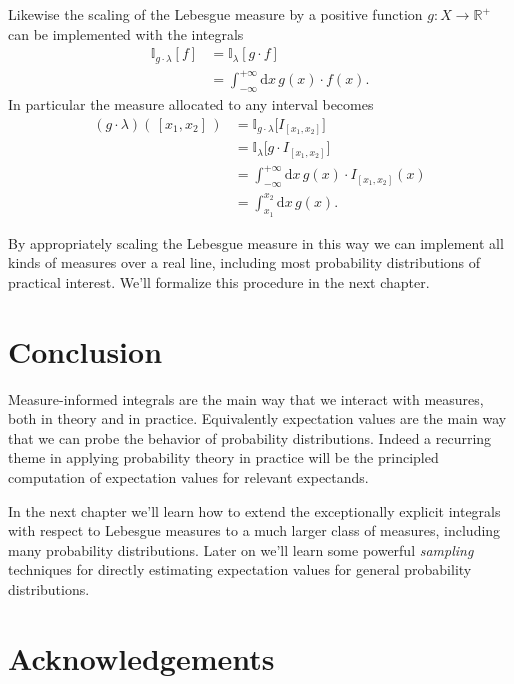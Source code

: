 \documentclass[
  letterpaper,
  DIV=11,
  numbers=noendperiod]{scrartcl}
\begin{document}
Likewise the scaling of the Lebesgue measure by a positive function
\(g : X \rightarrow \mathbb{R}^{+}\) can be implemented with the
integrals \begin{align*}
\mathbb{I}_{g \cdot \lambda}[f]
&=
\mathbb{I}_{\lambda}[g \cdot f]
\\
&=
\int_{-\infty}^{+\infty} \mathrm{d} x \, g(x) \cdot f(x).
\end{align*} In particular the measure allocated to any interval becomes
\begin{align*}
(g \cdot \lambda) ( \, [x_{1}, x_{2} ] \, )
&=
\mathbb{I}_{g \cdot \lambda} \big[ I_{ [x_{1}, x_{2}] } \big]
\\
&=
\mathbb{I}_{\lambda} \big[ g \cdot I_{ [x_{1}, x_{2}] } \big]
\\
&=
\int_{-\infty}^{+\infty}
\mathrm{d} x \, g(x) \cdot I_{ [x_{1}, x_{2}] }(x)
\\
&=
\int_{x_{1}}^{x_{2}} \mathrm{d} x \, g(x).
\end{align*}

By appropriately scaling the Lebesgue measure in this way we can
implement all kinds of measures over a real line, including most
probability distributions of practical interest. We'll formalize this
procedure in the next chapter.

\hypertarget{conclusion}{%
\section{Conclusion}\label{conclusion}}

Measure-informed integrals are the main way that we interact with
measures, both in theory and in practice. Equivalently expectation
values are the main way that we can probe the behavior of probability
distributions. Indeed a recurring theme in applying probability theory
in practice will be the principled computation of expectation values for
relevant expectands.

In the next chapter we'll learn how to extend the exceptionally explicit
integrals with respect to Lebesgue measures to a much larger class of
measures, including many probability distributions. Later on we'll learn
some powerful \emph{sampling} techniques for directly estimating
expectation values for general probability distributions.

\hypertarget{acknowledgements}{%
\section*{Acknowledgements}\label{acknowledgements}}
\end{document}
